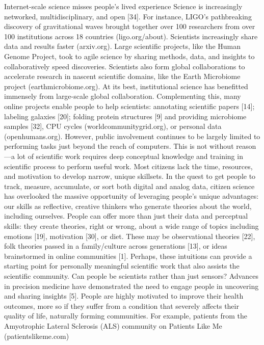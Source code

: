 Internet-scale science misses people’s lived experience
Science is increasingly networked, multidisciplinary, and
open [34]. For instance, LIGO’s pathbreaking discovery of
gravitational waves brought together over 100 researchers
from over 100 institutions across 18 countries
(ligo.org/about). Scientists increasingly share data and results faster (arxiv.org). Large scientific projects, like the Human Genome Project, took to agile science by sharing
methods, data, and insights to collaboratively speed discoveries. Scientists also form global collaborations to accelerate
research in nascent scientific domains, like the Earth Microbiome project (earthmicrobiome.org).
At its best, institutional science has benefitted immensely
from large-scale global collaboration. Complementing this,
many online projects enable people to help scientists: annotating scientific papers [14]; labeling galaxies [20]; folding
protein structures [9] and providing microbiome samples
[32], CPU cycles (worldcommunitygrid.org), or personal data
(openhumans.org). However, public involvement continues
to be largely limited to performing tasks just beyond the
reach of computers. This is not without reason—a lot of scientific work requires deep conceptual knowledge and training in scientific process to perform useful work. Most
citizens lack the time, resources, and motivation to develop
narrow, unique skillsets.
In the quest to get people to track, measure, accumulate, or
sort both digital and analog data, citizen science has overlooked the massive opportunity of leveraging people’s
unique advantages: our skills as reflective, creative thinkers
who generate theories about the world, including ourselves.
People can offer more than just their data and perceptual
skills: they create theories, right or wrong, about a wide
range of topics including emotions [19], motivation [30], or
diet. These may be observational theories [22], folk theories
passed in a family/culture across generations [13], or ideas
brainstormed in online communities [1]. Perhaps, these intuitions can provide a starting point for personally meaningful
scientific work that also assists the scientific community.
Can people be scientists rather than just sensors?
Advances in precision medicine have demonstrated the need
to engage people in uncovering and sharing insights [5]. People are highly motivated to improve their health outcomes,
more so if they suffer from a condition that severely affects
their quality of life, naturally forming communities. For example, patients from the Amyotrophic Lateral Sclerosis
(ALS) community on Patients Like Me (patientslikeme.com)

